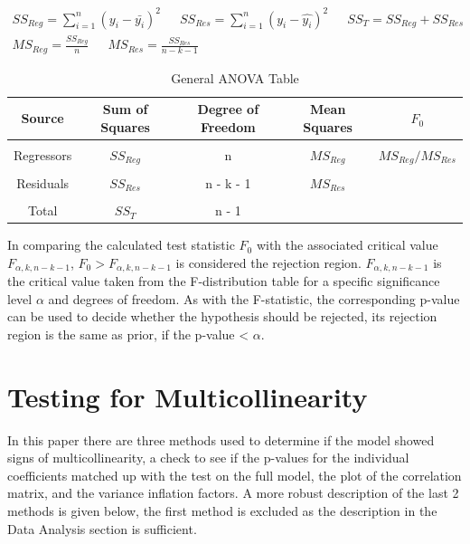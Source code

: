 \documentclass[12pt]{report}
\begin{document}
\begin{equation} \label{SSMS}
   \begin{split}
       SS_{Reg} = \sum_{i=1}^n ({y_{i} - \bar{y_{i}}})^2 \phantom{332}
       SS_{Res} = \sum_{i=1}^n (y_{i} - \hat{y_{i}})^2 \phantom{323}
       SS_{T} = SS_{Reg} + SS_{Res}
       \\
       MS_{Reg} = \frac{SS_{Reg}}{n} \phantom{332}
       MS_{Res} = \frac{SS_{Res}}{n - k - 1} \phantom{3323333333333}
   \end{split} 
\end{equation}
\begin{table}[H] 
\caption{General ANOVA Table} \label{tab:GA}
\medskip
\centering
\begin{tabular}{ccccc}
\textbf{Source} & \textbf{Sum of Squares} & \textbf{Degree of Freedom} & \textbf{Mean Squares} & \textbf{$F_0$} \\ \hline\\
Regressors      & $SS_{Reg}$              & n                          & $MS_{Reg}$            & $MS_{Reg} / MS_{Res}$  \\\\
Residuals       & $SS_{Res}$              & n - k - 1                  & $MS_{Res}$            &               \\\\
Total           & $SS_{T}$                & n - 1                      &                          &              
\end{tabular}
\end{table}

In comparing the calculated test statistic $F_0$ with the associated critical value $F_{\alpha,k,n - k - 1}$, $F_{0} > F_{\alpha,k,n-k-1}$ is considered the rejection region. $F_{\alpha,k,n - k - 1}$ is the critical value taken from the F-distribution table for a specific significance level $\alpha$ and degrees of freedom. As with the F-statistic, the corresponding p-value can be used to decide whether the hypothesis should be rejected, its rejection region is the same as prior, if the p-value < $\alpha$.

\section{Testing for Multicollinearity} 
In this paper there are three methods used to determine if the model showed signs of multicollinearity, a check to see if the p-values for the individual coefficients matched up with the test on the full model, the plot of the correlation matrix, and the variance inflation factors. A more robust description of the last 2 methods is given below, the first method is excluded as the description in the Data Analysis section is sufficient.
\end{document}
